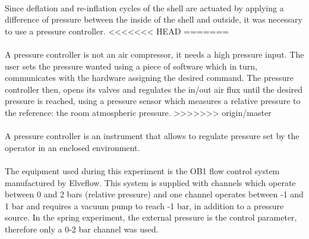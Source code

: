 \paragraph{}
Since deflation and re-inflation cycles of the shell are actuated by applying a difference of pressure between the inside of the shell and outside, it was necessary to use a pressure controller.
<<<<<<< HEAD
=======
\paragraph{}
A pressure controller is not an air compressor, it needs a high pressure input. The user sets the pressure wanted using a piece of software which in turn, communicates with the hardware assigning the desired command. The pressure controller then, opens its valves and regulates the in/out air flux until the desired pressure is reached, using a pressure sensor which measures a relative pressure to the reference: the room atmospheric pressure.
>>>>>>> origin/master
\paragraph{}
A pressure controller is an instrument that allows to regulate pressure set by the operator in an enclosed environment.
\paragraph{}
The equipment used during this experiment is the OB1 flow control system manufactured by Elveflow\textcopyright. This system is supplied with channels which operate between 0 and 2 bars (relative pressure) and one channel operates between -1 and 1 bar and requires a vacuum pump to reach -1 bar, in addition to a pressure source.
In the spring experiment, the external pressure is the control parameter, therefore only a 0-2 bar channel was used.
